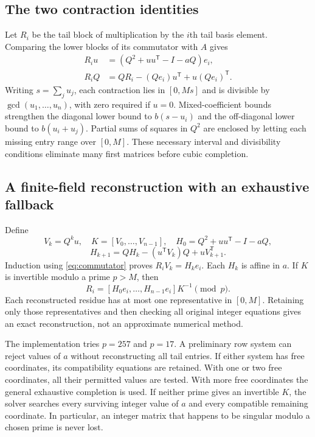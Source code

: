 \documentclass[11pt,a4paper]{article}
\theoremstyle{definition}\newtheorem{definition}[theorem]{Definition}\newtheorem{remark}[theorem]{Remark}
\begin{document}
\subsection{The two contraction identities}
Let $R_i$ be the tail block of multiplication by the $i$th tail basis element.
Comparing the lower blocks of its commutator with $A$ gives
\begin{align}
 R_i u&=(Q^2+uu^{\mathsf T}-I-aQ)e_i,\\
 R_iQ&=QR_i-(Qe_i)u^{\mathsf T}+u(Qe_i)^{\mathsf T}.
 \label{eq:commutator}
\end{align}
Writing $s=\sum_j u_j$, each contraction lies in $[0,Ms]$ and is divisible
by $\gcd(u_1,\ldots,u_n)$, with zero required if $u=0$. Mixed-coefficient
bounds strengthen the diagonal lower bound to $b(s-u_i)$ and the off-diagonal
lower bound to $b(u_i+u_j)$. Partial sums of squares in $Q^2$ are enclosed by
letting each missing entry range over $[0,M]$. These necessary interval and
divisibility conditions eliminate many first matrices before cubic completion.

\subsection{A finite-field reconstruction with an exhaustive fallback}
Define
\[
 V_k=Q^ku,\quad K=[V_0,\ldots,V_{n-1}],\quad
 H_0=Q^2+uu^{\mathsf T}-I-aQ,
\]
\[
 H_{k+1}=QH_k-(u^{\mathsf T}V_k)Q+uV_{k+1}^{\mathsf T}.
\]
Induction using \eqref{eq:commutator} proves $R_iV_k=H_ke_i$.
Each $H_k$ is affine in $a$. If $K$ is invertible modulo a prime $p>M$, then
\[
 R_i=[H_0e_i,\ldots,H_{n-1}e_i]K^{-1}\pmod p.
\]
Each reconstructed residue has at most one representative in $[0,M]$.
Retaining only those representatives and then checking all original integer
equations gives an exact reconstruction, not an approximate numerical method.

The implementation tries $p=257$ and $p=17$. A preliminary row system can
reject values of $a$ without reconstructing all tail entries. If either system
has free coordinates, its compatibility equations are retained. With one or
two free coordinates, all their permitted values are tested. With more free
coordinates the general exhaustive completion is used. If neither prime gives
an invertible $K$, the solver searches every surviving integer value of $a$
and every compatible remaining coordinate. In particular, an integer matrix
that happens to be singular modulo a chosen prime is never lost.
\end{document}
